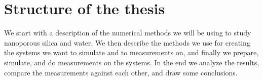 % 

 



\section*{Structure of the thesis}
%
We start with a description of the numerical methods we will be using to study nanoporous silica and water. We then describe the methods we use for creating the systems we want to simulate and to measurements on, and finally we prepare, simulate, and do measurements on the systems. In the end we analyze the results, compare the measurements against each other, and draw some conclusions.

% 




